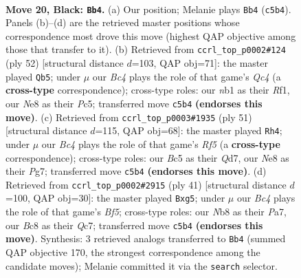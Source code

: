 \documentclass[11pt]{article}
\begin{document}
\clearpage

\begin{figure}[p]\centering
\begin{subfigure}{0.46\textwidth}\centering
\resizebox{\linewidth}{!}{%
\newchessgame
\chessboard[
  setfen={rnbqn1k1/1p4pp/5r2/p1b2p1P/P1PN1R2/6P1/6B1/RNBQ2K1 b - - 1 20},
  showmover=false,
  pgfstyle=straightmove, color=movearrow, markmove={c5-b4}
]}
\caption{}
\end{subfigure}\hfill
\begin{subfigure}{0.46\textwidth}\centering
\resizebox{\linewidth}{!}{%
\newchessgame
\chessboard[
  setfen={3r2k1/pp2p1b1/7p/2Pn1q2/2QPN1p1/5rP1/PB2RP2/5RK1 w - - 4 27},
  showmover=false,
  pgfstyle=straightmove, color=movearrow, markmove={c4-b5}
]}
\caption{}
\end{subfigure}
\\[4pt]
\begin{subfigure}{0.46\textwidth}\centering
\resizebox{\linewidth}{!}{%
\newchessgame
\chessboard[
  setfen={r5k1/3q2pp/pBNp4/3Pp1b1/Q3Pr2/7n/1PP4P/1K3R1R b - - 2 26},
  showmover=false,
  pgfstyle=straightmove, color=movearrow, markmove={f4-h4}
]}
\caption{}
\end{subfigure}\hfill
\begin{subfigure}{0.46\textwidth}\centering
\resizebox{\linewidth}{!}{%
\newchessgame
\chessboard[
  setfen={rn3k1r/p1q2ppp/2p1b3/6N1/p1PPNb2/8/BP2Q1K1/R6R b - - 1 21},
  showmover=false,
  pgfstyle=straightmove, color=movearrow, markmove={f4-g5}
]}
\caption{}
\end{subfigure}
\caption{\textbf{Move 20, Black: \texttt{Bb4}.} (a) Our position; Melanie plays \texttt{Bb4} (\texttt{c5b4}). Panels (b)--(d) are the retrieved master positions whose correspondence most drove this move (highest QAP objective among those that transfer to it). (b) Retrieved from \texttt{ccrl\_top\_p0002\#124} (ply 52) [structural distance $d$=103, QAP obj=71]: the master played \texttt{Qb5}; under $\mu$ our \emph{Bc4} plays the role of that game's \emph{Qc4} (a \textbf{cross-type} correspondence); cross-type roles: our \emph{n}b1 as their \emph{R}f1, our \emph{N}e8 as their \emph{P}c5; transferred move \texttt{c5b4} \textbf{(endorses this move)}. (c) Retrieved from \texttt{ccrl\_top\_p0003\#1935} (ply 51) [structural distance $d$=115, QAP obj=68]: the master played \texttt{Rh4}; under $\mu$ our \emph{Bc4} plays the role of that game's \emph{Rf5} (a \textbf{cross-type} correspondence); cross-type roles: our \emph{B}c5 as their \emph{Q}d7, our \emph{N}e8 as their \emph{P}g7; transferred move \texttt{c5b4} \textbf{(endorses this move)}. (d) Retrieved from \texttt{ccrl\_top\_p0002\#2915} (ply 41) [structural distance $d$=100, QAP obj=30]: the master played \texttt{Bxg5}; under $\mu$ our \emph{Bc4} plays the role of that game's \emph{Bf5}; cross-type roles: our \emph{N}b8 as their \emph{P}a7, our \emph{B}c8 as their \emph{Q}c7; transferred move \texttt{c5b4} \textbf{(endorses this move)}. Synthesis: 3 retrieved analogs transferred to \texttt{Bb4} (summed QAP objective 170, the strongest correspondence among the candidate moves); Melanie committed it via the \texttt{search} selector.}
\label{fig:thought-m39}
\end{figure}
\end{document}

